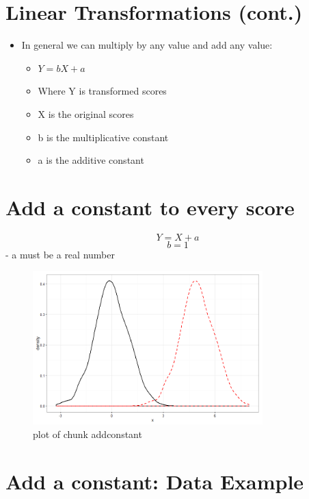 \documentclass[12pt]{article}
\begin{document}
\section{Linear Transformations
(cont.)}\label{linear-transformations-cont.}

\begin{itemize}
\itemsep1pt\parskip0pt
\item
  In general we can multiply by any value and add any value:

  \begin{itemize}
  \itemsep1pt\parskip0pt
  \item
    \(Y = bX + a\)
  \item
    Where Y is transformed scores
  \item
    X is the original scores
  \item
    b is the multiplicative constant
  \item
    a is the additive constant
  \end{itemize}
\end{itemize}

\section{Add a constant to every
score}\label{add-a-constant-to-every-score}

\[Y = X + a\] \[b = 1\] - a must be a real number

\begin{figure}[H]
\centering
\includegraphics[width=3.5in]{figure/addconstant-1.png}
\caption{plot of chunk addconstant}
\end{figure}

\section{Add a constant: Data
Example}\label{add-a-constant-data-example}
\end{document}
